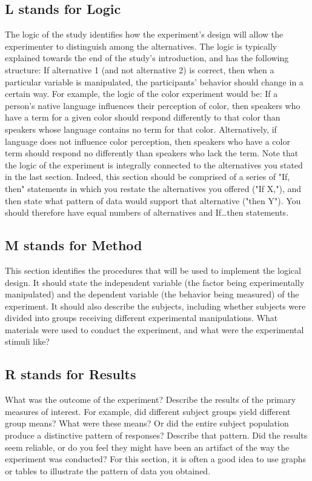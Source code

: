 \subsection{L stands for Logic}

The logic of the study identifies how the experiment's design will allow the experimenter to distinguish among the alternatives. The logic is typically explained towards the end of the study's introduction, and has the following structure: If alternative 1 (and not alternative 2) is correct, then when a particular variable is manipulated, the participants' behavior should change in a certain way. For example, the logic of the color experiment would be: If a person's native language influences their perception of color, then speakers who have a term for a given color should respond differently to that color than speakers whose language contains no term for that color. Alternatively, if language does not influence color perception, then speakers who have a color term should respond no differently than speakers who lack the term. Note that the logic of the experiment is integrally connected to the alternatives you stated in the last section. Indeed, this section should be comprised of a series of "If, then" statements in which you restate the alternatives you offered ("If X,"), and then state what pattern of data would support that alternative ("then Y"). You should therefore have equal numbers of alternatives and If…then statements. 

\subsection{M stands for Method}

This section identifies the procedures that will be used to implement the logical design. It should state the independent variable (the factor being experimentally manipulated) and the dependent variable (the behavior being measured) of the experiment. It should also describe the subjects, including whether subjects were divided into groups receiving different experimental manipulations. What materials were used to conduct the experiment, and what were the experimental stimuli like? 

\subsection{R stands for Results}

What was the outcome of the experiment? Describe the results of the primary measures of interest. For example, did different subject groups yield different group means? What were these means? Or did the entire subject population produce a distinctive pattern of responses? Describe that pattern. Did the results seem reliable, or do you feel they might have been an artifact of the way the experiment was conducted? For this section, it is often a good idea to use graphs or tables to illustrate the pattern of data you obtained. 

